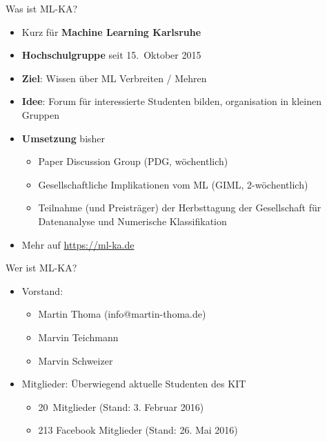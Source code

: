 \documentclass{beamer}
\begin{document}
\begin{frame}{Was ist ML-KA?}
    \begin{itemize}
        \item Kurz für \textbf{Machine Learning Karlsruhe}
        \item \textbf{Hochschulgruppe} seit 15.~Oktober 2015
        \item \textbf{Ziel}: Wissen über ML Verbreiten / Mehren
        \item \textbf{Idee}: Forum für interessierte Studenten bilden,
              organisation in kleinen Gruppen
        \item \textbf{Umsetzung} bisher
        \begin{itemize}
            \item Paper Discussion Group (PDG, wöchentlich)
            \item Gesellschaftliche Implikationen vom ML (GIML, 2-wöchentlich)
            \item Teilnahme (und Preisträger) der Herbsttagung der Gesellschaft
                  für Datenanalyse und Numerische Klassifikation
        \end{itemize}
        \item Mehr auf \href{https://ml-ka.de/}{https://ml-ka.de}
    \end{itemize}
\end{frame}

\begin{frame}{Wer ist ML-KA?}
    \begin{itemize}
        \item Vorstand:
        \begin{itemize}
            \item Martin Thoma (info@martin-thoma.de)
            \item Marvin Teichmann
            \item Marvin Schweizer
        \end{itemize}
        \item Mitglieder: Überwiegend aktuelle Studenten des KIT
        \begin{itemize}
            \item 20~Mitglieder (Stand: 3. Februar 2016)
            \item 213 Facebook Mitglieder (Stand: 26. Mai 2016)
        \end{itemize}
    \end{itemize}
\end{frame}
\end{document}

